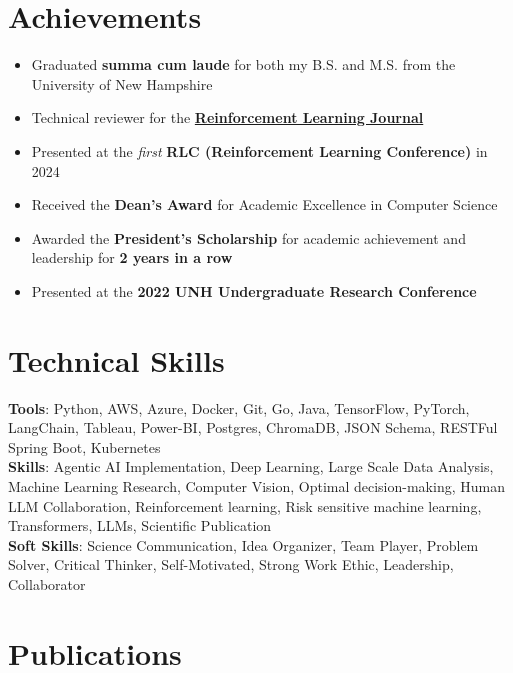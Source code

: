\documentclass[letterpaper,11pt]{article}
\begin{document}
\section{Achievements}
\begin{itemize} %
    \item Graduated \textbf{summa cum laude} for both my B.S. and M.S. from the University of New Hampshire
    \item Technical reviewer for the \href{https://rlj.cs.umass.edu/}{\textbf{Reinforcement Learning Journal}}
    \item Presented at the \emph{first} \textbf{RLC (Reinforcement Learning Conference)} in 2024
    \item Received the \textbf{Dean's Award} for Academic Excellence in Computer Science
    \item Awarded the \textbf{President's Scholarship} for academic achievement and leadership for \textbf{2 years in a row}
    \item Presented at the \textbf{2022 UNH Undergraduate Research Conference}
\end{itemize} %
\section{Technical Skills}
    \begin{itemize}[leftmargin=0.15in, label={}]
    \small{
      \item{
      \textbf{Tools}{: Python, AWS, Azure, Docker, Git, Go, Java, TensorFlow, PyTorch, LangChain, Tableau, Power-BI, Postgres, ChromaDB, JSON Schema, RESTFul Spring Boot, Kubernetes} \\[0.5em]
      \textbf{Skills}{: Agentic AI Implementation, Deep Learning, Large Scale Data Analysis, Machine Learning Research, Computer Vision, Optimal decision-making, Human LLM Collaboration, Reinforcement learning, Risk sensitive machine learning, Transformers, LLMs, Scientific Publication} \\ [0.5em]
      \textbf{Soft Skills}{: Science Communication, Idea Organizer, Team Player, Problem Solver, Critical Thinker, Self-Motivated, Strong Work Ethic, Leadership, Collaborator} \\ [0.5em]
      }
    }
  \end{itemize}
\section{Publications}
\resumeSubHeadingListStart
\end{document}
